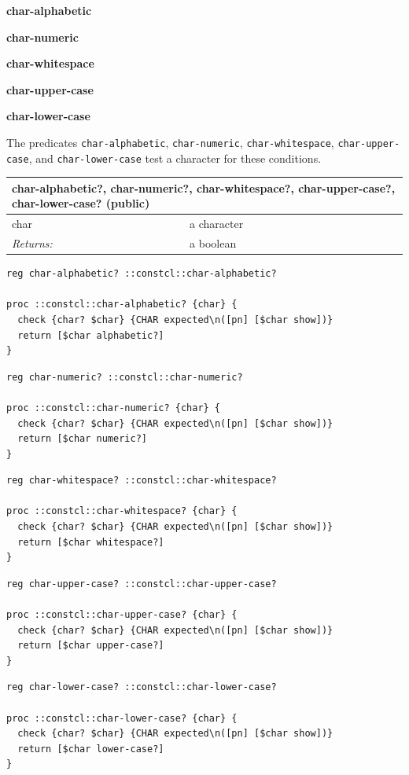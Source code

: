 \documentclass[twoside,9pt]{report}
\begin{document}
\textbf{char-alphabetic}


\textbf{char-numeric}


\textbf{char-whitespace}


\textbf{char-upper-case}


\textbf{char-lower-case}


The predicates \texttt{char-alphabetic}, \texttt{char-numeric}, \texttt{char-whitespace}, \texttt{char-upper-case}, and \texttt{char-lower-case} test a character for these conditions.

\begin{tabular}{ |l l| }
\hline
\multicolumn{2}{|l|}{char-alphabetic?, char-numeric?, char-whitespace?, char-upper-case?, char-lower-case? (public)} \\
\hline
char & a character \\
\textit{Returns:} & a boolean \\
\hline
\end{tabular}

\noindent\makebox[\linewidth]{\rule{\linewidth}{0.4pt}}
\begin{lstlisting}
reg char-alphabetic? ::constcl::char-alphabetic?
 
proc ::constcl::char-alphabetic? {char} {
  check {char? $char} {CHAR expected\n([pn] [$char show])}
  return [$char alphabetic?]
}
\end{lstlisting}
\noindent\makebox[\linewidth]{\rule{\linewidth}{0.4pt}}
\noindent\makebox[\linewidth]{\rule{\linewidth}{0.4pt}}
\begin{lstlisting}
reg char-numeric? ::constcl::char-numeric?
 
proc ::constcl::char-numeric? {char} {
  check {char? $char} {CHAR expected\n([pn] [$char show])}
  return [$char numeric?]
}
\end{lstlisting}
\noindent\makebox[\linewidth]{\rule{\linewidth}{0.4pt}}
\noindent\makebox[\linewidth]{\rule{\linewidth}{0.4pt}}
\begin{lstlisting}
reg char-whitespace? ::constcl::char-whitespace?
 
proc ::constcl::char-whitespace? {char} {
  check {char? $char} {CHAR expected\n([pn] [$char show])}
  return [$char whitespace?]
}
\end{lstlisting}
\noindent\makebox[\linewidth]{\rule{\linewidth}{0.4pt}}
\noindent\makebox[\linewidth]{\rule{\linewidth}{0.4pt}}
\begin{lstlisting}
reg char-upper-case? ::constcl::char-upper-case?
 
proc ::constcl::char-upper-case? {char} {
  check {char? $char} {CHAR expected\n([pn] [$char show])}
  return [$char upper-case?]
}
\end{lstlisting}
\noindent\makebox[\linewidth]{\rule{\linewidth}{0.4pt}}
\noindent\makebox[\linewidth]{\rule{\linewidth}{0.4pt}}
\begin{lstlisting}
reg char-lower-case? ::constcl::char-lower-case?
 
proc ::constcl::char-lower-case? {char} {
  check {char? $char} {CHAR expected\n([pn] [$char show])}
  return [$char lower-case?]
}
\end{lstlisting}
\noindent\makebox[\linewidth]{\rule{\linewidth}{0.4pt}}
\end{document}
